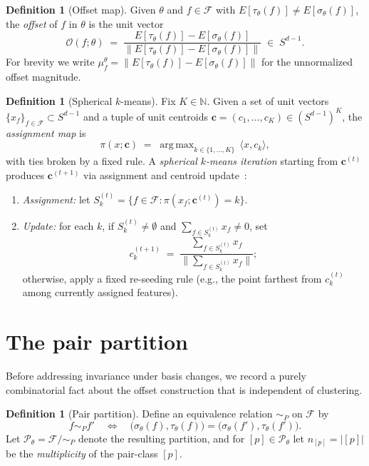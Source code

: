 \documentclass[11pt,letterpaper]{article}
\theoremstyle{definition}
\newtheorem{definition}[theorem]{Definition}
\DeclareMathOperator*{\argmax}{arg\,max}
\begin{document}
\begin{definition}[Offset map]
\label{def:offset}
Given $\theta$ and $f \in \mathcal{F}$ with $E[\tau_\theta(f)] \neq E[\sigma_\theta(f)]$, the \emph{offset} of $f$ in $\theta$ is the unit vector
\[
\mathcal{O}(f; \theta) \;=\; \frac{E[\tau_\theta(f)] - E[\sigma_\theta(f)]}{\big\| E[\tau_\theta(f)] - E[\sigma_\theta(f)] \big\|} \;\in\; S^{d-1}.
\]
For brevity we write $\mu_f^\theta = \| E[\tau_\theta(f)] - E[\sigma_\theta(f)] \|$ for the unnormalized offset magnitude.
\end{definition}

\begin{definition}[Spherical $k$-means]
\label{def:spherical-kmeans}
Fix $K \in \mathbb{N}$. Given a set of unit vectors $\{x_f\}_{f \in \mathcal{F}} \subset S^{d-1}$ and a tuple of unit centroids $\mathbf{c} = (c_1, \ldots, c_K) \in (S^{d-1})^K$, the \emph{assignment map} is
\[
\pi(x; \mathbf{c}) \;=\; \argmax_{k \in \{1, \ldots, K\}} \, \langle x, c_k \rangle,
\]
with ties broken by a fixed rule. A \emph{spherical $k$-means iteration} starting from $\mathbf{c}^{(t)}$ produces $\mathbf{c}^{(t+1)}$ via assignment and centroid update~\citep{dhillon_modha_2001}:
\begin{enumerate}[label=(\roman*), itemsep=0pt]
\item \emph{Assignment:} let $S_k^{(t)} = \{ f \in \mathcal{F} : \pi(x_f; \mathbf{c}^{(t)}) = k \}$.
\item \emph{Update:} for each $k$, if $S_k^{(t)} \neq \emptyset$ and $\sum_{f \in S_k^{(t)}} x_f \neq 0$, set
\[
c_k^{(t+1)} \;=\; \frac{\sum_{f \in S_k^{(t)}} x_f}{\big\| \sum_{f \in S_k^{(t)}} x_f \big\|};
\]
otherwise, apply a fixed re-seeding rule (e.g., the point farthest from $c_k^{(t)}$ among currently assigned features).
\end{enumerate}
\end{definition}

\section{The pair partition}

Before addressing invariance under basis changes, we record a purely combinatorial fact about the offset construction that is independent of clustering.

\begin{definition}[Pair partition]
\label{def:pair-partition}
Define an equivalence relation $\sim_P$ on $\mathcal{F}$ by
\[
f \sim_P f' \quad \Longleftrightarrow \quad \big( \sigma_\theta(f), \tau_\theta(f) \big) = \big( \sigma_\theta(f'), \tau_\theta(f') \big).
\]
Let $\mathcal{P}_\theta = \mathcal{F} / \sim_P$ denote the resulting partition, and for $[p] \in \mathcal{P}_\theta$ let $n_{[p]} = |[p]|$ be the \emph{multiplicity} of the pair-class $[p]$.
\end{definition}
\end{document}
